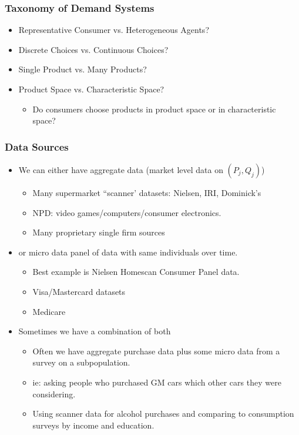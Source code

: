 \documentclass[aspectratio=169,11pt]{beamer}
\begin{document}
\begin{frame}
\frametitle{Taxonomy of Demand Systems}
\begin{itemize}
\item Representative Consumer vs. Heterogeneous Agents?
\item Discrete Choices vs. Continuous Choices?
\item Single Product vs. Many Products?
\item Product Space vs. Characteristic Space?
\begin{itemize}
\item Do consumers choose products in product space or in characteristic space?
\end{itemize}
\end{itemize}
\end{frame}


\begin{frame}
\frametitle{Data Sources}
\begin{itemize}
\item We can either have \alert{aggregate data} (market level data on $(P_j,Q_j)$)
\begin{itemize}
\item Many supermarket ``scanner' datasets: Nielsen, IRI, Dominick's
\item NPD: video games/computers/consumer electronics.
\item Many proprietary single firm sources
\end{itemize}
\item or \alert{micro data} panel of data with same individuals over time.
\begin{itemize}
\item Best example is Nielsen Homescan Consumer Panel data.
\item Visa/Mastercard datasets
\item Medicare
\end{itemize}
\item Sometimes we have a combination of both
\begin{itemize}
\item Often we have aggregate purchase data plus some \alert{micro data} from a survey on a subpopulation.
\item ie: asking people who purchased GM cars which other cars they were considering.
\item Using scanner data for alcohol purchases and comparing to consumption surveys by income and education.
\end{itemize}
\end{itemize}
\end{frame}
\end{document}
